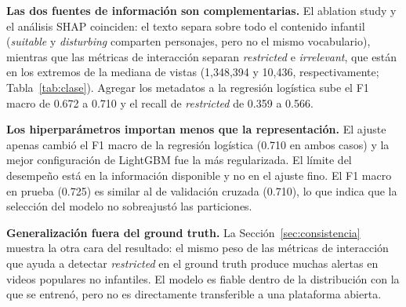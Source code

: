 \documentclass[conference]{IEEEtran}
\begin{document}
\textbf{Las dos fuentes de información son complementarias.} El ablation study y el análisis SHAP coinciden: el texto separa sobre todo el contenido infantil (\textit{suitable} y \textit{disturbing} comparten personajes, pero no el mismo vocabulario), mientras que las métricas de interacción separan \textit{restricted} e \textit{irrelevant}, que están en los extremos de la mediana de vistas (1,348,394 y 10,436, respectivamente; Tabla~\ref{tab:clase}). Agregar los metadatos a la regresión logística sube el F1 macro de 0.672 a 0.710 y el recall de \textit{restricted} de 0.359 a 0.566.

\textbf{Los hiperparámetros importan menos que la representación.} El ajuste apenas cambió el F1 macro de la regresión logística (0.710 en ambos casos) y la mejor configuración de LightGBM fue la más regularizada. El límite del desempeño está en la información disponible y no en el ajuste fino. El F1 macro en prueba (0.725) es similar al de validación cruzada (0.710), lo que indica que la selección del modelo no sobreajustó las particiones.

\textbf{Generalización fuera del ground truth.} La Sección~\ref{sec:consistencia} muestra la otra cara del resultado: el mismo peso de las métricas de interacción que ayuda a detectar \textit{restricted} en el ground truth produce muchas alertas en videos populares no infantiles. El modelo es fiable dentro de la distribución con la que se entrenó, pero no es directamente transferible a una plataforma abierta.
\end{document}
